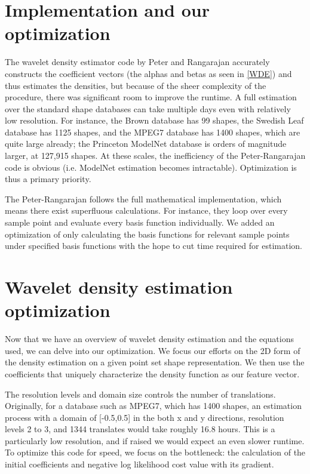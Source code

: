 \documentclass[../tech_report_1.tex]{subfiles}
\begin{document}
\section{Implementation and our optimization}

The wavelet density estimator code by Peter and Rangarajan accurately constructs the coefficient vectors (the alphas and betas as seen in \ref{WDE}) and thus estimates the densities, but because of the sheer complexity of the procedure, there was significant room to improve the runtime. A full estimation over the standard shape databases can take multiple days even with relatively low resolution.
For instance, the Brown database \cite{sebastian2004recognition} has 99 shapes, the Swedish Leaf database \cite{soderkvist2001computer} has 1125 shapes, and the MPEG7 database \cite{jeannin1999description, bober2001mpeg} has 1400 shapes, which are quite large already; the Princeton ModelNet database is orders of magnitude larger, at 127,915 shapes. At these scales, the inefficiency of the Peter-Rangarajan code is obvious (i.e. ModelNet estimation becomes intractable). Optimization is thus a primary priority.

The Peter-Rangarajan follows the full mathematical implementation, which means there exist superfluous calculations. For instance, they loop over every sample point and evaluate every basis function individually. We added an optimization of only calculating the basis functions
for relevant sample points under specified basis functions with the
hope to cut time required for estimation.

\section{Wavelet density estimation optimization}

Now that we have an overview of wavelet density estimation and the
equations used, we can delve into our optimization. We focus our efforts on the 2D form of the density estimation on a given point set shape representation.
We then use the coefficients that uniquely characterize the density
function as our feature vector. 

The resolution levels and domain size controls the number of translations. Originally, for a database such as
MPEG7, which has 1400 shapes, an estimation process with a domain of {[}-0.5,0.5{]} in the both x and y directions, resolution
levels 2 to 3, and 1344 translates would take roughly 16.8 hours.
This is a particularly low resolution, and if raised we would expect
an even slower runtime. To optimize this code for speed, we focus on the
bottleneck: the calculation of the initial coefficients and negative
log likelihood cost value with its gradient. 
\end{document}
